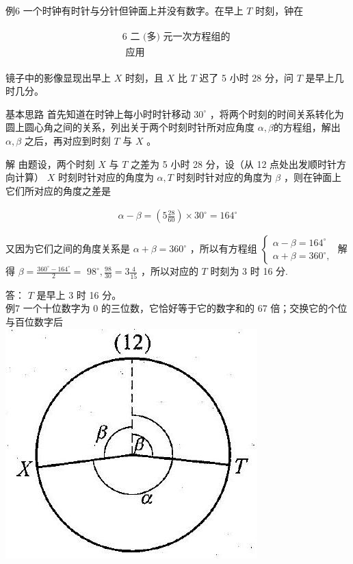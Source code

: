 \documentclass[10pt]{article}
\begin{document}
例6 一个时钟有时针与分针但钟面上并没有数字。在早上 $T$ 时刻，钟在

\begin{align*}
\begin{gathered}
6 \text { 二 (多) 元一次方程组的 } \\
\text { 应用 }
\end{gathered}
\end{align*}

镜子中的影像显现出早上 $X$ 时刻，且 $X$ 比 $T$ 迟了 5 小时 28 分，问 $T$ 是早上几时几分。

基本思路 首先知道在时钟上每小时时针移动 $30^{\circ}$ ，将两个时刻的时间关系转化为圆上圆心角之间的关系，列出关于两个时刻时针所对应角度 $\alpha, \beta$的方程组，解出 $\alpha, \beta$ 之后，再对应到时刻 $T$ 与 $X$ 。

解 由题设，两个时刻 $X$ 与 $T$ 之差为 5 小时 28 分，设（从 12 点处出发顺时针方向计算） $X$ 时刻时针对应的角度为 $\alpha, T$ 时刻时针对应的角度为 $\beta$ ，则在钟面上它们所对应的角度之差是

\begin{align*}
\alpha-\beta=\left(5 \frac{28}{60}\right) \times 30^{\circ}=164^{\circ}
\end{align*}

又因为它们之间的角度关系是 $\alpha+\beta=360^{\circ}$ ，所以有方程组 $\left\{\begin{array}{l}\alpha-\beta=164^{\circ} \\ \alpha+\beta=360^{\circ},\end{array}\right.$ 解得 $\beta=\frac{360^{\circ}-164^{\circ}}{2}=$ $98^{\circ}, \frac{98}{30}=3 \frac{4}{15}$ ，所以对应的 $T$ 时刻为 3 时 16 分.

答： $T$ 是早上 3 时 16 分。\\
例7 一个十位数字为 0 的三位数，它恰好等于它的数字和的 67 倍；交换它的个位与百位数字后\\
\includegraphics[max width=\textwidth, center]{2024_10_30_26b590fd1106d28139f0g-036}
\end{document}
